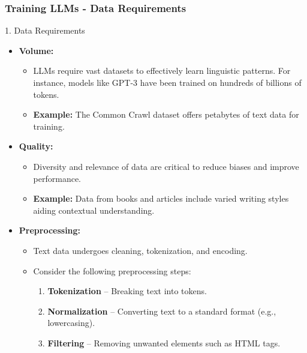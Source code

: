 \documentclass[aspectratio=169]{beamer}
\begin{document}
\begin{frame}[fragile]
    \frametitle{Training LLMs - Data Requirements}
    \begin{block}{1. Data Requirements}
        \begin{itemize}
            \item \textbf{Volume:}
                \begin{itemize}
                    \item LLMs require vast datasets to effectively learn linguistic patterns. For instance, models like GPT-3 have been trained on hundreds of billions of tokens.
                    \item \textbf{Example:} The Common Crawl dataset offers petabytes of text data for training.
                \end{itemize}
            \item \textbf{Quality:}
                \begin{itemize}
                    \item Diversity and relevance of data are critical to reduce biases and improve performance.
                    \item \textbf{Example:} Data from books and articles include varied writing styles aiding contextual understanding.
                \end{itemize}
            \item \textbf{Preprocessing:}
                \begin{itemize}
                    \item Text data undergoes cleaning, tokenization, and encoding. 
                    \item Consider the following preprocessing steps:
                        \begin{enumerate}
                            \item \textbf{Tokenization} – Breaking text into tokens.
                            \item \textbf{Normalization} – Converting text to a standard format (e.g., lowercasing).
                            \item \textbf{Filtering} – Removing unwanted elements such as HTML tags.
                        \end{enumerate}
                \end{itemize}
        \end{itemize}
    \end{block}
\end{frame}
\end{document}

